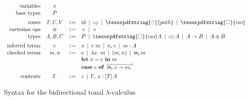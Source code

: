 \documentclass{rntz}
\newcommand{\bnfeq}{\dblcolon=}
\newcommand{\bnfcont}{}
\newcommand{\pipe}{~\,|\,~}
\newcommand{\mb}[1]{\ensuremath{\mathbf{#1}}}
\newcommand{\emptycx}{\varepsilon}
\newcommand{\G}{\Gamma}
\newcommand{\x}{\times}
\newcommand{\fn}{\lambda}
\newcommand{\binder}{.~}
\newcommand{\bind}[1]{{#1}\binder}
\newcommand{\fnof}[1]{\fn\bind{#1}}
\newcommand{\subtype}{\le}
\newcommand{\ein}[2]{\textsf{in}_{#1}\:{#2}}
\newcommand{\cto}{\shortrightarrow}
\newcommand{\ecase}[1]{\mb{case}~{#1}~\mb{of}~\,}
\newcommand\opcolor{\color{ForestGreen}}
\newcommand\isocolor{\color{NavyBlue}}
\newcommand\pathcolor{\color{Bittersweet}}
\newcommand\id{\ensuremath{\mathrm{id}}}
\newcommand\op{\ensuremath{\mathrm{\opcolor op}}}
\newcommand\iso{\texorpdfstring{\ensuremath{{\isocolor\Box}}}{iso}}
\renewcommand\path{\texorpdfstring{\ensuremath{{\pathcolor\lozenge}}}{path}}
\newcommand\opof[1]{\ensuremath{\op\,#1}}
\newcommand\isof[1]{\ensuremath{\iso #1}}
\newcommand{\mtp}[2]{\left[#1\right] #2}
\newcommand{\extend}[2]{{#1},\, {#2}}
\newcommand{\tpcolor}{}%
\newcommand{\tmcolor}{}%
\newcommand{\cxcolor}{}%
\newcommand{\strips}{\prec}
\newcommand{\uh}[2]{#1 : #2}            %
\newcommand{\h}[3]{\uh{#1}{\mtp{#2}{#3}}}
\newcommand{\infers}[3]{{\tmcolor#1} \Rightarrow {\cxcolor#2} \vdash {\tpcolor#3}}
\newcommand{\checks}[3]{{\tmcolor#1} \Leftarrow {\cxcolor#2} \vdash {\tpcolor#3}}
\newcommand{\mbinop}{\oast}
\newcommand{\adjoint}[2]{#1 \dashv #2}
\begin{document}
\begin{figure*}
  \[\begin{array}{rcclr}
    \text{variables} & x\vspace{1pt}\\
    \text{base types} & P
    \vspace{0.5em}\\

    \text{tones} & T,U,V & \bnfeq & \id \pipe \op \pipe \path \pipe \iso
    \vspace{1pt}\\
    \text{cartesian ops} & \mbinop &\bnfeq& {+} \pipe {\x}
    \vspace{1pt}\\
    \text{types} & A,B,C
    &\bnfeq& P \pipe \isof{A} \pipe \opof{A} \pipe A \to B \pipe A \mbinop B
    \vspace{0.5em}\\

    \text{inferred terms} & e
    &\bnfeq& x \pipe e\;m \pipe \pi_i\;e \pipe m : A \vspace{1pt}\\
    \text{checked terms} & m,n
    &\bnfeq& e \pipe \fnof{x} m \pipe (m,n) \pipe \ein{i}{m}\\
    &&\bnfcont& \mb{let}~x = e~\mb{in}~ m\\
    &&\bnfcont& \ecase{e} \xbar{i}{\ein{i}{x} \cto m_i}
    \vspace{0.5em}\\

    \text{contexts} & \G
    &\bnfeq& \emptycx \pipe \extend{\G}{\h{x}{T}{A}}
  \end{array}\]
  
  \caption{Syntax for the bidirectional tonal $\lambda$-calculus}
  \label{fig:tonal-lambda-calculus}
\end{figure*}
\end{document}
